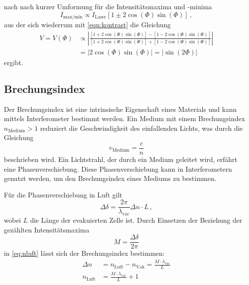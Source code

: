nach nach kurzer Umformung 
 für die Intensitätsmaxima und -minima
\begin{equation*}
    I_\text{max/min} \propto I_\text{Laser} \left[ 1 \pm 2 \cos(\Phi) \sin (\Phi) \right] \, ,
\end{equation*}
aus der sich wiederrum mit \autoref{eqn:kontrast} die Gleichung
\begin{align}\label{eqn:kontrast2}
    V = V(\Phi) &\propto \left|\frac{\left[ 1 + 2 \cos(\Phi) \sin (\Phi) \right] - \left[ 1 - 2 \cos(\Phi) \sin (\Phi) \right]}{\left[ 1 + 2 \cos(\Phi) \sin (\Phi) \right] + \left[ 1 - 2 \cos(\Phi) \sin (\Phi) \right]}\right| \\
    &= \left|2 \cos(\Phi) \sin(\Phi) \right| = \left| \sin (2 \Phi) \right|
\end{align}
ergibt. %
\subsection{Brechungsindex} \label{sec:n}

Der Brechungsindex ist eine intrinsische Eigenschaft eines Materials und kann mittels Interferometer bestimmt werden. Ein Medium mit einem Brechungsindex $n_\text{Medium} > 1$ reduziert die Geschwindigkeit des einfallenden Lichts, was durch die Gleichung
\begin{equation*}
    v_\text{Medium} = \frac{c}{n}
\end{equation*}
beschrieben wird. Ein Lichtstrahl, der durch ein Medium geleitet wird, erfährt eine Phasenverschiebung. Diese Phasenverschiebung kann in Interferometern genutzt werden, um den Brechungsindex eines Mediums zu bestimmen.

Für die Phasenverschiebung in Luft gilt
\begin{equation} \label{eq:nluft}
    \Delta \delta = \frac{2 \pi}{\lambda_\text{vac}} \Delta n \cdot L \, ,
\end{equation}
wobei $L$ die Länge der evakuierten Zelle ist. Durch Einsetzen der Beziehung der gezählten Intensitätsmaxima 
\begin{equation} \label{eq:maxima}
    M = \frac{\Delta \delta}{2 \pi}
\end{equation}
in \autoref{eq:nluft} lässt sich der Brechungsindex bestimmen:
\begin{align} \label{eq:nluft2}
    \Delta n &= n_\text{Luft} - n_\text{Vak} = \frac{M \cdot \lambda_\text{vac}}{L} \nonumber \\
    n_\text{Luft} &= \frac{M \cdot \lambda_\text{vac}}{L} + 1
\end{align}

